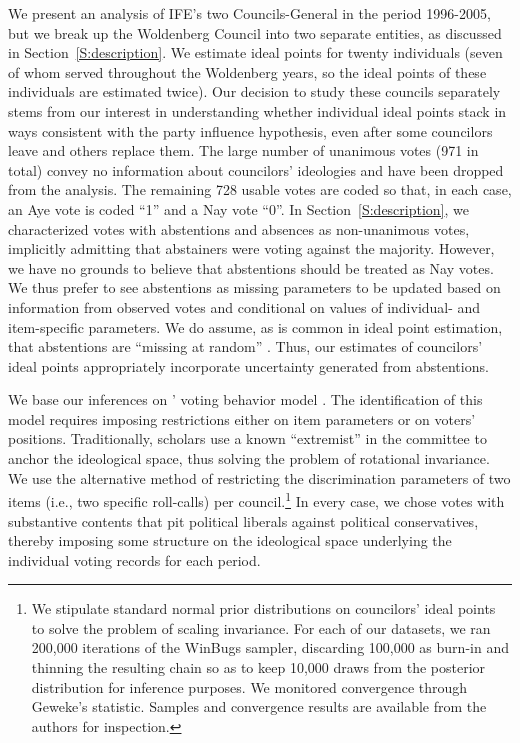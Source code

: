 \documentclass[12 pt, letter]{article}
\begin{document}
We present an analysis of IFE's two Councils-General in the period 1996-2005, but we break up the Woldenberg Council into two separate entities, as discussed in Section~\ref{S:description}.  We estimate ideal points for twenty individuals (seven of whom served throughout the Woldenberg years, so the ideal points of these individuals are estimated twice).  Our decision to study these councils separately stems from our interest in understanding whether individual ideal points stack in ways consistent with the party influence hypothesis, even after some councilors leave and others replace them. The large number of unanimous votes (971 in total) convey no information about councilors' ideologies and have been dropped from the analysis.  The remaining 728 usable votes are coded so that, in each case, an Aye vote is coded ``1'' and a Nay vote ``0''.  In Section~\ref{S:description}, we characterized votes with abstentions and absences as non-unanimous votes, implicitly admitting that abstainers were voting against the majority.  However, we have no grounds to believe that abstentions should be treated as Nay votes.  We thus prefer to see abstentions as missing parameters to be updated based on information from observed votes and conditional on values of individual- and item-specific parameters.  We do assume, as is common in ideal point estimation, that abstentions are ``missing at random'' \citep{Little1987, Clinton2004}.  Thus, our estimates of councilors' ideal points appropriately incorporate uncertainty generated from abstentions.


We base our inferences on \citeauthor*{Clinton2004}' voting behavior model \citep{Clinton2004, Martin2002}.  The identification of this model requires imposing restrictions either on item parameters or on voters' positions.  Traditionally, scholars use a known ``extremist'' in the committee to anchor the ideological space, thus solving the problem of rotational invariance.  We use the alternative method of restricting the discrimination parameters of two items (i.e., two specific roll-calls) per council.\footnote{We stipulate standard normal prior distributions on councilors' ideal points to solve the problem of scaling invariance. For each of our datasets, we ran 200,000 iterations of the WinBugs sampler, discarding 100,000 as burn-in and thinning the resulting chain so as to keep 10,000 draws from the posterior distribution for inference purposes. We monitored convergence through Geweke's statistic.  Samples and convergence results are available from the authors for inspection.} In every case, we chose votes with substantive contents that pit political liberals against political conservatives, thereby imposing some structure on the ideological space underlying the individual voting records for each period.  
\end{document}

